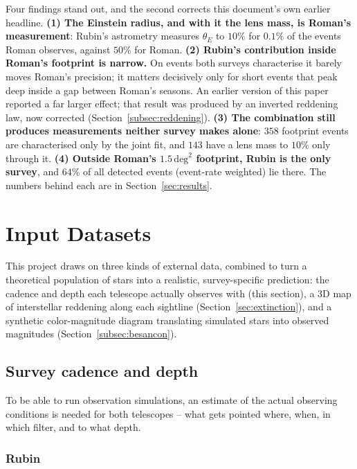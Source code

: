 \documentclass[english,10pt,a4paper]{article}
\begin{document}
	Four findings stand out, and the second corrects this document's own earlier headline. \textbf{(1) The Einstein radius, and with it the lens mass, is Roman's measurement}: Rubin's astrometry measures $\theta_E$ to $10\%$ for $0.1\%$ of the events Roman observes, against $50\%$ for Roman. \textbf{(2) Rubin's contribution inside Roman's footprint is narrow.} On events both surveys characterise it barely moves Roman's precision; it matters decisively only for short events that peak deep inside a gap between Roman's seasons. An earlier version of this paper reported a far larger effect; that result was produced by an inverted reddening law, now corrected (Section~\ref{subsec:reddening}). \textbf{(3) The combination still produces measurements neither survey makes alone}: $358$ footprint events are characterised only by the joint fit, and $143$ have a lens mass to $10\%$ only through it. \textbf{(4) Outside Roman's $1.5\,\mathrm{deg}^2$ footprint, Rubin is the only survey}, and $64\%$ of all detected events (event-rate weighted) lie there. The numbers behind each are in Section~\ref{sec:results}.

	\section{Input Datasets}
	\label{sec:input_datasets}
	
	This project draws on three kinds of external data, combined to turn a theoretical population of stars into a realistic, survey-specific prediction: the cadence and depth each telescope actually observes with (this section), a 3D map of interstellar reddening along each sightline (Section~\ref{sec:extinction}), and a synthetic color-magnitude diagram translating simulated stars into observed magnitudes (Section~\ref{subsec:besancon}).
	
	\subsection{Survey cadence and depth}
	\label{subsec:cadence}
	
	To be able to run observation simulations, an estimate of the actual observing conditions is needed for both telescopes -- what gets pointed where, when, in which filter, and to what depth.
	
	\subsubsection{Rubin}
	
\end{document}
